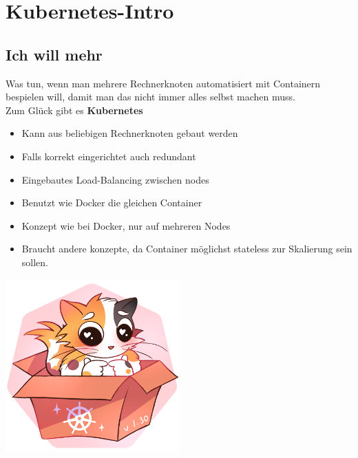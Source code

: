 \section{Kubernetes-Intro}
\subsection{Ich will mehr}

\begin{frame}
    \slidehead
    \Large
    \centering
    Was tun, wenn man mehrere Rechnerknoten automatisiert mit Containern bespielen will,
    damit man das nicht immer alles selbst machen muss. \\
    \vspace{3em}
    Zum Glück gibt es \textbf{Kubernetes}
\end{frame}

\begin{frame}
    \slidehead
    \Large
    \begin{itemize}[<+->]
        \item Kann aus beliebigen Rechnerknoten gebaut werden
        \item Falls korrekt eingerichtet auch redundant
        \item Eingebautes Load-Balancing zwischen nodes
        \item Benutzt wie Docker die gleichen Container
        \item Konzept wie bei Docker, nur auf mehreren Nodes
        \item Braucht andere konzepte, da Container möglichst stateless zur Skalierung sein sollen.
    \end{itemize}
\end{frame}

\begin{frame}
    \centering
    
\end{frame}
\begin{frame}
    \centering
    
\end{frame}

\begin{frame}
    \centering
    \includegraphics[height=18em]{../pictures/k8s-1.30.png} \\
\end{frame}
